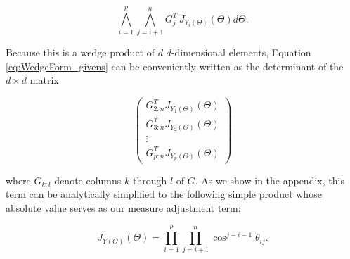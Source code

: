 \documentclass[ba]{imsart}
\numberwithin{equation}{section}
\theoremstyle{plain}
\begin{document}
\begin{equation}
\label{eq:WedgeForm_givens}
\bigwedge_{i=1}^p \bigwedge_{j=i+1}^n G_j^T\, J_{Y_i(\Theta)}(\Theta) d\Theta.
\end{equation}

\noindent Because this is a wedge product of $d$ $d$-dimensional elements, Equation \ref{eq:WedgeForm_givens} can be conveniently written as the determinant of the $d \times d$ matrix

\begin{equation}
\label{eq:measure_matrix_form}
\begin{pmatrix}
G_{2:n}^T J_{Y_1(\Theta)}(\Theta)\\
G_{3:n}^T J_{Y_2(\Theta)}(\Theta)\\
\vdots\\
G_{p:n}^T J_{Y_p(\Theta)}(\Theta)
\end{pmatrix}
\end{equation}

\noindent where $G_{k:l}$ denote columns $k$ through $l$ of $G$. As we show in the appendix, this term can be analytically simplified to the following simple product whose absolute value serves as our measure adjustment term:

\begin{equation}
\label{eq:final_change_of_measure}
J_{Y(\Theta)}(\Theta) = \prod_{i=1}^p \prod_{j=i+1}^n \cos^{j-i-1} \theta_{ij}.
\end{equation}


\end{document}
